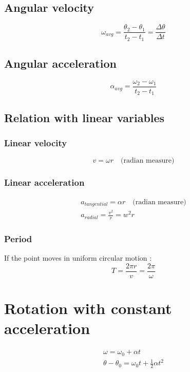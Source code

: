 \documentclass[Master.tex]{subfiles}
\begin{document}
\begin{multicols}{2}
		  \subsection{Angular velocity}

				   \[
						    \omega _{avg} = \frac{\theta _{2} - \theta _{1}   }{t_2 - t_1} = \frac{\Delta \theta }{\Delta t}
				   \]

		  \subsection{Angular acceleration}
				   \[
						    \alpha _{avg} = \frac{\omega _{2} - \omega _{1}   }{t_2 - t_1 }
				   \]

		  \subsection{Relation with linear variables}
				   \subsubsection{Linear velocity}
						    \[
								     v = \omega r \quad \text{(radian measure)}
						    \]

				   \subsubsection{Linear acceleration}

						    \begin{gather*}
								     a_{tangential}  = \alpha r \quad \text{(radian measure)}\\
								     a_{radial} = \frac{v^2}{r} = w^2r
						    \end{gather*}
				   \subsubsection{Period}
						    If the point moves in uniform circular motion :
						    \[
								     T = \frac{2\pi r}{v} = \frac{2\pi }{\omega }
						    \]

		 \section{Rotation with constant acceleration}
		  \begin{gather*}
				   \omega = \omega_{0} + \alpha t \\
				   \theta - \theta_{0 }= \omega _{0} t + \frac{1}{2} \alpha t^{2}
		  \end{gather*}


\end{multicols}
\end{document}
